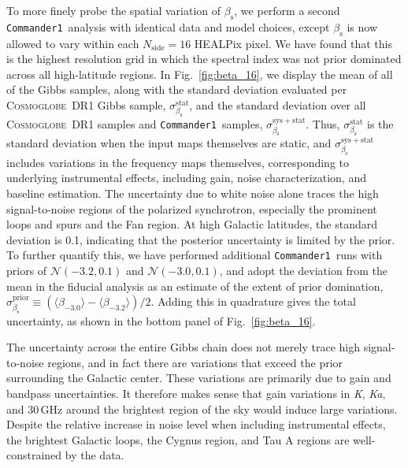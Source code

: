 \documentclass[twocolumn]{../../common/aa}
\def\commanderone{\texttt{Commander1}}
\newcommand{\cosmoglobe}{\textsc{Cosmoglobe}}
\newcommand{\K}[0]{\textit K}
\newcommand{\Ka}[0]{\textit{Ka}}
\begin{document}
To more finely probe the spatial variation of $\beta_\mathrm s$, we perform a second \commanderone\ analysis with identical data and model choices, except $\beta_\mathrm s$ is now allowed to vary within each $N_\mathrm{side}=16$ HEALPix pixel. We have found that this is the highest resolution grid in which the spectral index was not prior dominated across all high-latitude regions. In Fig.~\ref{fig:beta_16}, we display the mean of all of the Gibbs samples, along with the standard deviation evaluated per \cosmoglobe\ DR1 Gibbs sample, $\sigma_{\beta_\mathrm s}^\mathrm{stat}$, and the standard deviation over all \cosmoglobe\ DR1 samples and \commanderone\ samples, $\sigma_{\beta_\mathrm s}^\mathrm{sys+stat}$. Thus, $\sigma_{\beta_\mathrm s}^\mathrm{stat}$ is the standard deviation when the input maps themselves are static, and $\sigma_{\beta_\mathrm s}^\mathrm{sys+stat}$ includes variations in the frequency maps themselves, corresponding to underlying instrumental effects, including gain, noise characterization, and baseline estimation. The uncertainty due to white noise alone  traces the high signal-to-noise regions of the polarized synchrotron, especially the prominent loops and spurs and the Fan region. At high Galactic latitudes, the standard deviation is 0.1, indicating that the posterior uncertainty is limited by the prior. To further quantify this, we have performed additional \commanderone\ runs with priors of $\mathcal N(-3.2,0.1)$ and $\mathcal N(-3.0,0.1)$, and adopt the deviation from the mean in the fiducial analysis as an estimate of the extent of prior domination, $\sigma_{\beta_\mathrm s}^\mathrm{prior}\equiv (\langle \beta_{-3.0}\rangle-\langle\beta_{-3.2}\rangle)/2$. Adding this in quadrature gives the total uncertainty, as shown in the bottom panel of Fig.~\ref{fig:beta_16}.

The uncertainty across the entire Gibbs chain does not merely trace high signal-to-noise regions, and in fact there are variations that exceed the prior surrounding the Galactic center. These variations are primarily due to gain and bandpass uncertainties. It therefore makes sense that gain variations in \K, \Ka, and 30\,GHz around the brightest region of the sky would induce large variations. Despite the relative increase in noise level when including instrumental effects, the brightest Galactic loops, the Cygnus region, and Tau A regions are well-constrained by the data.
\end{document}
